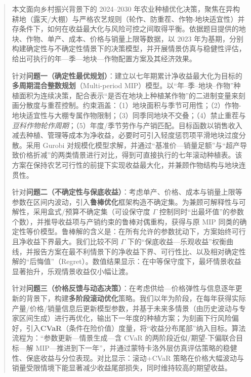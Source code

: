 



\begin{abstract}
    \begingroup
    \setlength{\baselineskip}{17.4pt}%
    
本文面向乡村振兴背景下的 2024--2030 年农业种植优化决策，聚焦在异构耕地（露天/大棚）与严格农艺规则（轮作、防重茬、作物-地块适宜性）并存条件下，如何在收益最大化与风险可控之间取得平衡。依据题目提供的地块、作物、单产、成本、价格与销量上限等数据，以 2023 年为基期，分别构建确定性与不确定性情景下的决策模型，并开展情景仿真与稳健性评估，给出可执行的年—季—地块—作物配置方案及其经济效果。
    
针对\textbf{问题一（确定性最优规划）}：建立以七年期累计净收益最大化为目标的\textbf{多周期混合整数规划}（Multi-period MIP）模型。以“年–季–地块–作物”种植面积为连续决策，配合表示“是否在地块上种植某作物”的二进制变量来刻画分散度与重茬控制。约束涵盖：（1）地块面积与季节可用性；（2）作物-地块适宜性与大棚专属作物限制；（3）同季同地块不交叠；（4）禁止重茬与\emph{豆科作物轮作周期}；（5）年度/季节劳作与产销匹配。目标函数以销售收入减去种植、管理等成本为净收益，必要时可引入轻度惩罚项平滑地块过度分散。采用 Gurobi 对规模化模型求解，并通过“基准价—销量足额”与“超产导致价格折减”的两类情景进行对比，得到可直接执行的七年滚动种植表。该方案在保持农艺可行性的前提下实现收益最大化，并兼顾作物结构与地块连贯性。
    
针对\textbf{问题二（不确定性与保底收益）}：考虑单产、价格、成本与销量上限等参数在区间内波动，引入\textbf{鲁棒优化}框架构造不确定集。为兼顾可解释性与可解性，采用盒式/预算不确定集（可设保守度 \(\Gamma\) 控制同时“出最坏值”的参数个数），并推导收益项与产销约束的鲁棒对偶重构，获得与原 MIP 同类的确定性等价模型。鲁棒解的含义是：在所有允许的参数扰动下，方案始终可行且净收益下界最大。我们比较不同 \(\Gamma\) 下的“保底收益—乐观收益”权衡曲线，并报告方案在最不利情景下的净收益下界、可行性比、以及相对确定性解的“后悔值”（Regret）。数值结果显示：在中等保守度下，最坏情景收益显著抬升，乐观情景收益仅小幅让渡。
    
针对\textbf{问题三（价格反馈与动态决策）}：在考虑供给—价格弹性与信息逐年更新的背景下，构建\textbf{多阶段滚动优化}策略。我们以年为阶段，在每年获得实际产量/价格/销量信息后更新模型参数，并基于未来多情景（由历史波动与专家区间生成）进行再优化，输出下一年度的种植方案；为刻画下行风险偏好，引入\textbf{CVaR}（条件在险价值）度量，将“收益分布尾部”纳入目标。算法流程为：“参数更新—情景生成—含 CVaR 的两阶段近似/期望-下偏联合目标—解 MIP—推进到下一年”，并通过蒙特卡洛外层仿真评估策略的稳健性、保底收益与分位表现。对比显示：滚动+CVaR 策略在价格大幅波动与销量受限情境下能显著减少收益尾部损失，同时维持较高的期望收益。
    

\end{abstract}
